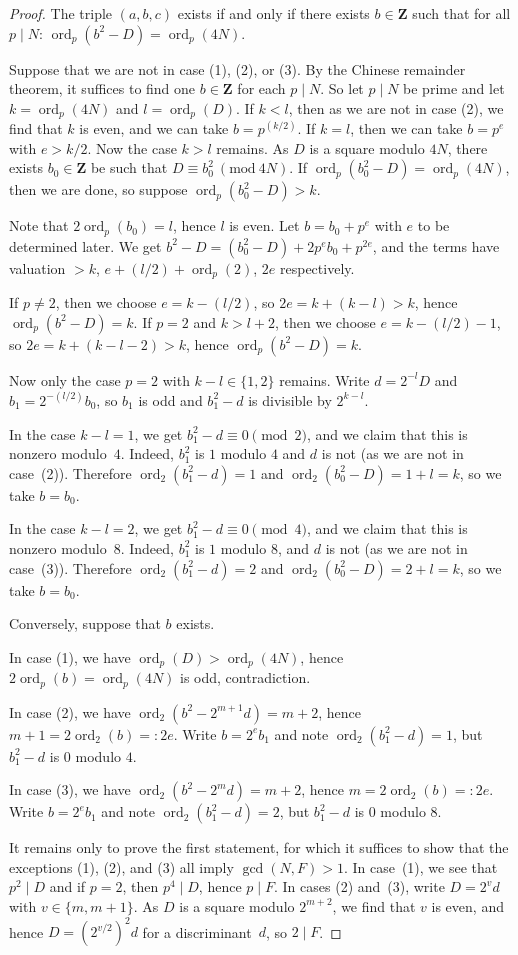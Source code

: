 \documentclass{amsart}
\newcommand{\ZZ}{\mathbf{Z}}
\DeclareMathOperator{\ord}{ord}
\numberwithin{equation}{section}
\theoremstyle{definition}
\begin{document}
\begin{proof}
The triple $(a,b,c)$ exists if and only if there exists $b\in\ZZ$
such that for all $p\mid N$: $\ord_p(b^2-D) = \ord_p(4N)$.

Suppose that we are not in case (1), (2), or (3).
By the Chinese remainder theorem, it suffices to find one $b\in\ZZ$
for each $p\mid N$.
So let $p\mid N$ be prime and let $k = \ord_p(4N)$ and $l = \ord_p(D)$.
If $k < l$, then as we are not in case (2), we find that $k$ is even,
and we can take $b = p^{(k/2)}$.
If $k=l$, then we can take $b = p^e$ with $e>k/2$.
Now the case $k>l$ remains.
As $D$ is a square modulo $4N$, there exists
$b_0\in\ZZ$ be such that $D\equiv b_0^2\ (\mathrm{mod}\ 4N)$.
If $\ord_p(b_0^2-D) = \ord_p(4N)$, then we are done,
so suppose $\ord_p(b_0^2-D)>k$.

Note that $2\ord_p(b_0) = l$, hence $l$ is even.
Let $b = b_0 + p^{e}$ with $e$ to be determined later.
We get $b^2-D = (b_0^2-D) + 2p^{e}b_0 + p^{2e}$,
and the terms have valuation $>k$, $e+(l/2)+\ord_p(2)$, $2e$ respectively.

If $p\not=2$, then we choose $e=k-(l/2)$, so $2e = k+(k-l) > k$,
hence $\ord_p(b^2-D) = k$.
If $p=2$ and $k > l+2$, then we choose $e=k-(l/2)-1$, so $2e = k+(k-l-2)>k$,
hence $\ord_p(b^2-D) = k$.

Now only the case $p=2$ with $k-l\in\{1,2\}$ remains.
Write $d = 2^{-l}D$ and $b_1 = 2^{-(l/2)} b_0$, so $b_1$ is odd
and $b_1^2-d$ is divisible by $2^{k-l}$.

In the case $k-l = 1$, we get $b_1^2 - d \equiv 0\pmod{2}$,
and we claim that this is nonzero modulo~$4$.
Indeed, $b_1^2$ is $1$ modulo $4$ and $d$ is not (as we are not in case~(2)).
Therefore $\ord_2(b_1^2-d) = 1$
and $\ord_2(b_0^2-D) = 1+l=k$, so we take $b = b_0$.

In the case $k-l = 2$, we get $b_1^2 - d\equiv 0\pmod{4}$,
and we claim that this is nonzero modulo~$8$.
Indeed, $b_1^2$ is $1$ modulo $8$, and $d$ is not (as we are not in case~(3)).
Therefore $\ord_2(b_1^2-d) = 2$ and $\ord_2(b_0^2-D) = 2 + l = k$, so we take $b = b_0$.

Conversely, suppose that $b$ exists.

In case (1), we have $\ord_p(D)> \ord_p(4N)$, hence
$2\ord_p(b) =\ord_p(4N)$ is odd, contradiction.

In case (2), we have $\ord_2(b^2-2^{m+1}d) = m+2$,
hence $m+1 = 2\ord_2(b)=: 2e$. Write $b = 2^{e}b_1$ and note
$\ord_2(b_1^2-d) = 1$, but $b_1^2-d$ is $0$ modulo $4$.

In case (3), we have $\ord_2(b^2-2^{m}d) = m+2$,
hence $m = 2\ord_2(b)=:2e$. Write $b = 2^eb_1$
and note
$\ord_2(b_1^2-d) = 2$, but $b_1^2-d$ is $0$ modulo $8$.

It remains only to prove the first statement, for which it suffices to show that the exceptions
(1), (2), and (3) all imply $\gcd(N,F)>1$.
In case~(1), we see that $p^2\mid D$ and if $p=2$, then $p^4\mid D$,
hence $p\mid F$.
In cases (2) and~(3), write $D = 2^v d$ with $v\in\{m,m+1\}$.
As $D$ is a square modulo $2^{m+2}$,
we find that $v$ is even, and hence $D = (2^{v/2})^2 d$ for a discriminant~$d$,
so $2\mid F$.
\end{proof}
\end{document}
